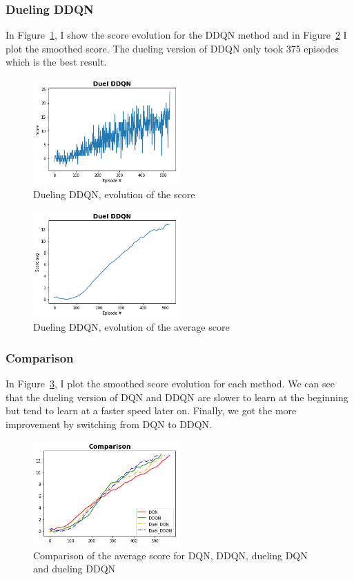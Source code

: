 \documentclass[12pt]{article}
\begin{document}
\subsubsection{Dueling DDQN}
In Figure~\ref{fig:duel_ddqn}, I show the score evolution for the DDQN method and in Figure~\ref{fig:duel_ddqn_av} I plot the smoothed score. The dueling version of DDQN only took 375 episodes which is the best result.

\begin{figure}[H]
 \centering
  \includegraphics[width=0.5\textwidth]{../PNG/duel_ddqn.png}
  \caption{Dueling DDQN, evolution of the score}
  \label{fig:duel_ddqn}
\end{figure}

\begin{figure}[H]
 \centering
  \includegraphics[width=0.5\textwidth]{../PNG/duel_ddqn_smooth.png}
  \caption{Dueling DDQN, evolution of the average score}
  \label{fig:duel_ddqn_av}
\end{figure}


\subsubsection{Comparison}
In Figure~\ref{fig:comparison}, I plot the smoothed score evolution for each method. 
We can see that the dueling version of DQN and DDQN are slower to learn at the beginning but tend to learn at a faster speed later on. 
Finally, we got the more improvement by switching from DQN to DDQN.

\begin{figure}[H]
 \centering
  \includegraphics[width=0.5\textwidth]{../PNG/Comparison.png}
  \caption{Comparison of the average score for DQN, DDQN, dueling DQN and dueling DDQN}
  \label{fig:comparison}
\end{figure}
\end{document}
